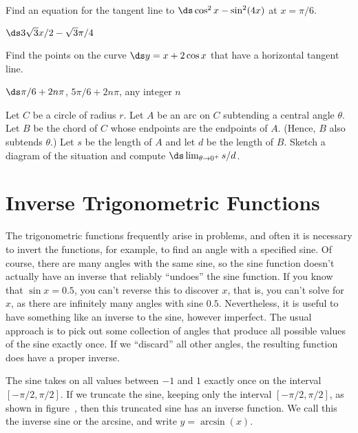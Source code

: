 \begin{exercises}
\begin{exercise} Find an equation for the tangent line to $\ds \cos ^2 x -
\sin ^2 (4x)$ at $x=\pi/6$.
\begin{answer} $\ds 3\sqrt3x/2-\sqrt3\pi/4$
\end{answer}\end{exercise}

\begin{exercise} Find the points on the curve $\ds y= x+ 2\cos x$ that have a
horizontal tangent line.
\begin{answer} $\ds \pi/6+2n\pi$, $5\pi/6+2n\pi$, any integer $n$
\end{answer}\end{exercise}

\begin{exercise} Let $C$ be a circle of radius $r$. Let $A$ be an arc on $C$
subtending a central angle $\theta$. Let $B$ be the chord of
$C$ whose endpoints are the endpoints of $A$. (Hence, $B$ also
subtends $\theta$.) Let $s$ be the length of $A$
and let $d$ be the length of $B$. Sketch a diagram of the situation
and compute $\ds \lim_{\theta \to 0^+ } s/d$.
\end{exercise}

\end{exercises}




\section{Inverse Trigonometric Functions}{}{}
\nobreak
The trigonometric functions frequently arise in problems, and often it
is necessary to invert the functions, for example, to find an angle with
a specified sine. Of course, there are many angles with the same sine,
so the sine function doesn't actually have an inverse that reliably
``undoes'' the sine function. If you know that $\sin x=0.5$, you can't
reverse this to discover $x$, that is, you can't solve for
$x$, as there are infinitely many angles with sine
$0.5$. Nevertheless, it is useful to have something like an inverse to
the sine, however imperfect. The usual approach is to pick out some
collection of angles that produce all possible values of the sine
exactly once. If we ``discard'' all other angles, the resulting
function does have a proper inverse.

The sine takes on all values between $-1$ and $1$ exactly once on the
interval $[-\pi/2,\pi/2]$. If we truncate the sine, keeping only the
interval $[-\pi/2,\pi/2]$, as shown in figure~, then this truncated sine has an inverse function. We call this
the inverse sine or the arcsine, and
write $y=\arcsin(x)$.

